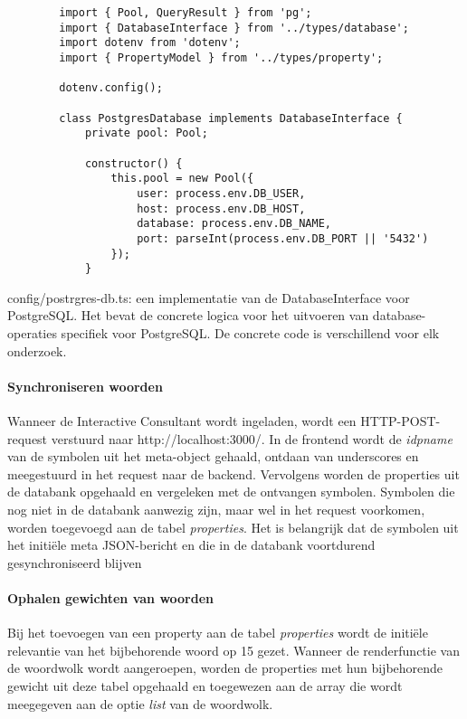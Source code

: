 \begin{listing}
    \begin{verbatim}
        import { Pool, QueryResult } from 'pg';
        import { DatabaseInterface } from '../types/database';
        import dotenv from 'dotenv';
        import { PropertyModel } from '../types/property';
        
        dotenv.config();
        
        class PostgresDatabase implements DatabaseInterface {
            private pool: Pool;
            
            constructor() {
                this.pool = new Pool({
                    user: process.env.DB_USER,
                    host: process.env.DB_HOST,
                    database: process.env.DB_NAME,
                    port: parseInt(process.env.DB_PORT || '5432')
                });
            }
    \end{verbatim}
    \caption{config/postrgres-db.ts: een implementatie van de DatabaseInterface voor PostgreSQL. Het bevat de concrete logica voor het uitvoeren van database-operaties specifiek voor PostgreSQL. De concrete code is verschillend voor elk onderzoek.}
    \label{code:config/postgres}
\end{listing}

\paragraph{Synchroniseren woorden}
Wanneer de Interactive Consultant wordt ingeladen, wordt een HTTP-POST-request verstuurd naar http://localhost:3000/. In de frontend wordt de \textit{idpname} van de symbolen uit het meta-object gehaald, ontdaan van underscores en meegestuurd in het request naar de backend. Vervolgens worden de properties uit de databank opgehaald en vergeleken met de ontvangen symbolen. Symbolen die nog niet in de databank aanwezig zijn, maar wel in het request voorkomen, worden toegevoegd aan de tabel \textit{properties}. Het is belangrijk dat de symbolen uit het initiële meta JSON-bericht en die in de databank voortdurend gesynchroniseerd blijven

\paragraph{Ophalen gewichten van woorden}
Bij het toevoegen van een property aan de tabel \textit{properties} wordt de initiële relevantie van het bijbehorende woord op 15 gezet. Wanneer de renderfunctie van de woordwolk wordt aangeroepen, worden de properties met hun bijbehorende gewicht uit deze tabel opgehaald en toegewezen aan de array die wordt meegegeven aan de optie \textit{list} van de woordwolk.

